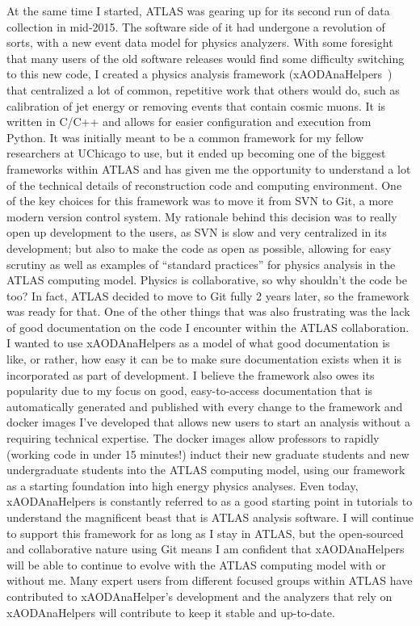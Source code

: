 \documentclass[letterpaper, 10pt]{article}
\begin{document}
At the same time I started, ATLAS was gearing up for its second run of data collection in mid-2015. The software side of it had undergone a revolution of sorts, with a new event data model for physics analyzers. With some foresight that many users of the old software releases would find some difficulty switching to this new code, I created a physics analysis framework (xAODAnaHelpers~) that centralized a lot of common, repetitive work that others would do, such as calibration of jet energy or removing events that contain cosmic muons. It is written in C/C++ and allows for easier configuration and execution from Python. It was initially meant to be a common framework for my fellow researchers at UChicago to use, but it ended up becoming one of the biggest frameworks within ATLAS and has given me the opportunity to understand a lot of the technical details of reconstruction code and computing environment. One of the key choices for this framework was to move it from SVN to Git, a more modern version control system. My rationale behind this decision was to really open up development to the users, as SVN is slow and very centralized in its development; but also to make the code as open as possible, allowing for easy scrutiny as well as examples of ``standard practices'' for physics analysis in the ATLAS computing model. Physics is collaborative, so why shouldn't the code be too? In fact, ATLAS decided to move to Git fully 2 years later, so the framework was ready for that. One of the other things that was also frustrating was the lack of good documentation on the code I encounter within the ATLAS collaboration. I wanted to use xAODAnaHelpers as a model of what good documentation is like, or rather, how easy it can be to make sure documentation exists when it is incorporated as part of development. I believe the framework also owes its popularity due to my focus on good, easy-to-access documentation that is automatically generated and published with every change to the framework and docker images I've developed that allows new users to start an analysis without a requiring technical expertise. The docker images allow professors to rapidly (working code in under 15 minutes!) induct their new graduate students and new undergraduate students into the ATLAS computing model, using our framework as a starting foundation into high energy physics analyses. Even today, xAODAnaHelpers is constantly referred to as a good starting point in tutorials to understand the magnificent beast that is ATLAS analysis software. I will continue to support this framework for as long as I stay in ATLAS, but the open-sourced and collaborative nature using Git means I am confident that xAODAnaHelpers will be able to continue to evolve with the ATLAS computing model with or without me. Many expert users from different focused groups within ATLAS have contributed to xAODAnaHelper's development and the analyzers that rely on xAODAnaHelpers will contribute to keep it stable and up-to-date.
\end{document}
